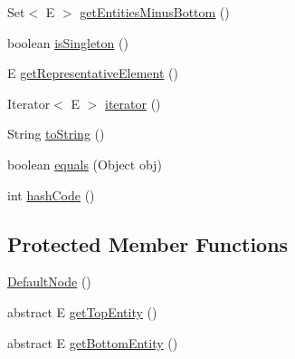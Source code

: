 \begin{DoxyCompactItemize}
\item 
Set$<$ E $>$ \hyperlink{classorg_1_1semanticweb_1_1owlapi_1_1reasoner_1_1impl_1_1_default_node_3_01_e_01extends_01_o_w_l_object_01_4_a955f36fc0a227ef182bea4416ee667d9}{get\-Entities\-Minus\-Bottom} ()
\item 
boolean \hyperlink{classorg_1_1semanticweb_1_1owlapi_1_1reasoner_1_1impl_1_1_default_node_3_01_e_01extends_01_o_w_l_object_01_4_a63362a78c058e1f68aac00721b140fc3}{is\-Singleton} ()
\item 
E \hyperlink{classorg_1_1semanticweb_1_1owlapi_1_1reasoner_1_1impl_1_1_default_node_3_01_e_01extends_01_o_w_l_object_01_4_a9074e79f43a3b9baf9fbee9dac86aaaf}{get\-Representative\-Element} ()
\item 
Iterator$<$ E $>$ \hyperlink{classorg_1_1semanticweb_1_1owlapi_1_1reasoner_1_1impl_1_1_default_node_3_01_e_01extends_01_o_w_l_object_01_4_afce3201bbd27c1d2129ca1ebb6fbd3d9}{iterator} ()
\item 
String \hyperlink{classorg_1_1semanticweb_1_1owlapi_1_1reasoner_1_1impl_1_1_default_node_3_01_e_01extends_01_o_w_l_object_01_4_af9c028bc7ba031c98d0c7e773c2e20d8}{to\-String} ()
\item 
boolean \hyperlink{classorg_1_1semanticweb_1_1owlapi_1_1reasoner_1_1impl_1_1_default_node_3_01_e_01extends_01_o_w_l_object_01_4_aa488c3e3101ac24617e56eab8dfb6523}{equals} (Object obj)
\item 
int \hyperlink{classorg_1_1semanticweb_1_1owlapi_1_1reasoner_1_1impl_1_1_default_node_3_01_e_01extends_01_o_w_l_object_01_4_ae57685674210bbbafc5dc7cae297cd44}{hash\-Code} ()
\end{DoxyCompactItemize}
\subsection*{Protected Member Functions}
\begin{DoxyCompactItemize}
\item 
\hyperlink{classorg_1_1semanticweb_1_1owlapi_1_1reasoner_1_1impl_1_1_default_node_3_01_e_01extends_01_o_w_l_object_01_4_a4d662a1eb7d64c815e3ea22bf98eb287}{Default\-Node} ()
\item 
abstract E \hyperlink{classorg_1_1semanticweb_1_1owlapi_1_1reasoner_1_1impl_1_1_default_node_3_01_e_01extends_01_o_w_l_object_01_4_acb90ce8269c10df96a915282f0bc8d01}{get\-Top\-Entity} ()
\item 
abstract E \hyperlink{classorg_1_1semanticweb_1_1owlapi_1_1reasoner_1_1impl_1_1_default_node_3_01_e_01extends_01_o_w_l_object_01_4_a7d02d238e06b8796c3ac9037a4fa7028}{get\-Bottom\-Entity} ()
\end{DoxyCompactItemize}
